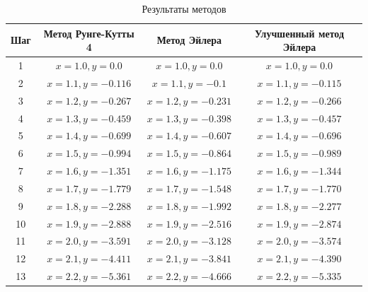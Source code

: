 \documentclass[12pt]{article}
\begin{document}
    \begin{table}[h]
        \centering
        \caption{Результаты методов}
        \begin{tabular}{|c|c|c|c|}
            \hline
            \textbf{Шаг} & \textbf{Метод Рунге-Кутты 4} & \textbf{Метод Эйлера}  & \textbf{Улучшенный метод Эйлера} \\
            \hline
            1            & $x = 1.0, y = 0.0$           & $x = 1.0, y = 0.0$     & $x = 1.0, y = 0.0$               \\
            \hline
            2            & $x = 1.1, y = -0.116$         & $x = 1.1, y = -0.1$    & $x = 1.1, y = -0.115$            \\
            \hline
            3            & $x = 1.2, y = -0.267$         & $x = 1.2, y = -0.231$  & $x = 1.2, y = -0.266$            \\
            \hline
            4            & $x = 1.3, y = -0.459$         & $x = 1.3, y = -0.398$  & $x = 1.3, y = -0.457$            \\
            \hline
            5            & $x = 1.4, y = -0.699$         & $x = 1.4, y = -0.607$  & $x = 1.4, y = -0.696$            \\
            \hline
            6            & $x = 1.5, y = -0.994$         & $x = 1.5, y = -0.864$  & $x = 1.5, y = -0.989$            \\
            \hline
            7            & $x = 1.6, y = -1.351$         & $x = 1.6, y = -1.175$  & $x = 1.6, y = -1.344$            \\
            \hline
            8            & $x = 1.7, y = -1.779$         & $x = 1.7, y = -1.548$  & $x = 1.7, y = -1.770$            \\
            \hline
            9            & $x = 1.8, y = -2.288$         & $x = 1.8, y = -1.992$  & $x = 1.8, y = -2.277$            \\
            \hline
            10           & $x = 1.9, y = -2.888$         & $x = 1.9, y = -2.516$  & $x = 1.9, y = -2.874$            \\
            \hline
            11           & $x = 2.0, y = -3.591$         & $x = 2.0, y = -3.128$  & $x = 2.0, y = -3.574$            \\
            \hline
            12           & $x = 2.1, y = -4.411$         & $x = 2.1, y = -3.841$  & $x = 2.1, y = -4.390$            \\
            \hline
            13           & $x = 2.2, y = -5.361$         & $x = 2.2, y = -4.666$  & $x = 2.2, y = -5.335$            \\
            \hline
        \end{tabular}
    \end{table}
\end{document}
